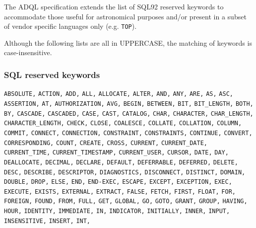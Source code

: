 \documentclass[11pt,a4paper]{ivoa}
\begin{document}
The ADQL specification extends the list of SQL92 reserved keywords to accommodate
those useful for astronomical purposes and/or present in a subset of vendor
specific languages only (e.g. \verb:TOP:).

Although the following lists are all in UPPERCASE, the matching of keywords
is case-insensitive.

\subsubsection{SQL reserved keywords}
\label{sec:adql.keywords}

\begin{raggedright}
\noindent
\texttt{ABSOLUTE,} \texttt{ACTION,} \texttt{ADD,} \texttt{ALL,}
\texttt{ALLOCATE,} \texttt{ALTER,} \texttt{AND,} \texttt{ANY,}
\texttt{ARE,} \texttt{AS,} \texttt{ASC,} \texttt{ASSERTION,}
\texttt{AT,} \texttt{AUTHORIZATION,} \texttt{AVG,} \texttt{BEGIN,}
\texttt{BETWEEN,} \texttt{BIT,} \texttt{BIT\_LENGTH,} \texttt{BOTH,}
\texttt{BY,} \texttt{CASCADE,} \texttt{CASCADED,} \texttt{CASE,}
\texttt{CAST,} \texttt{CATALOG,} \texttt{CHAR,} \texttt{CHARACTER,}
\texttt{CHAR\_LENGTH,} \texttt{CHARACTER\_LENGTH,} \texttt{CHECK,}
\texttt{CLOSE,} \texttt{COALESCE,} \texttt{COLLATE,}
\texttt{COLLATION,} \texttt{COLUMN,} \texttt{COMMIT,}
\texttt{CONNECT,} \texttt{CONNECTION,} \texttt{CONSTRAINT,}
\texttt{CONSTRAINTS,} \texttt{CONTINUE,} \texttt{CONVERT,}
\texttt{CORRESPONDING,} \texttt{COUNT,} \texttt{CREATE,}
\texttt{CROSS,} \texttt{CURRENT,} \texttt{CURRENT\_DATE,}
\texttt{CURRENT\_TIME,} \texttt{CURRENT\_TIMESTAMP,}
\texttt{CURRENT\_USER,} \texttt{CURSOR,} \texttt{DATE,} \texttt{DAY,}
\texttt{DEALLOCATE,} \texttt{DECIMAL,} \texttt{DECLARE,}
\texttt{DEFAULT,} \texttt{DEFERRABLE,} \texttt{DEFERRED,}
\texttt{DELETE,} \texttt{DESC,} \texttt{DESCRIBE,}
\texttt{DESCRIPTOR,} \texttt{DIAGNOSTICS,} \texttt{DISCONNECT,}
\texttt{DISTINCT,} \texttt{DOMAIN,} \texttt{DOUBLE,} \texttt{DROP,}
\texttt{ELSE,} \texttt{END,} \texttt{END-EXEC,} \texttt{ESCAPE,}
\texttt{EXCEPT,} \texttt{EXCEPTION,} \texttt{EXEC,} \texttt{EXECUTE,}
\texttt{EXISTS,} \texttt{EXTERNAL,} \texttt{EXTRACT,} \texttt{FALSE,}
\texttt{FETCH,} \texttt{FIRST,} \texttt{FLOAT,} \texttt{FOR,}
\texttt{FOREIGN,} \texttt{FOUND,} \texttt{FROM,} \texttt{FULL,}
\texttt{GET,} \texttt{GLOBAL,} \texttt{GO,} \texttt{GOTO,}
\texttt{GRANT,} \texttt{GROUP,} \texttt{HAVING,} \texttt{HOUR,}
\texttt{IDENTITY,} \texttt{IMMEDIATE,} \texttt{IN,}
\texttt{INDICATOR,} \texttt{INITIALLY,} \texttt{INNER,}
\texttt{INPUT,} \texttt{INSENSITIVE,} \texttt{INSERT,} \texttt{INT,}

\end{raggedright}
\end{document}
